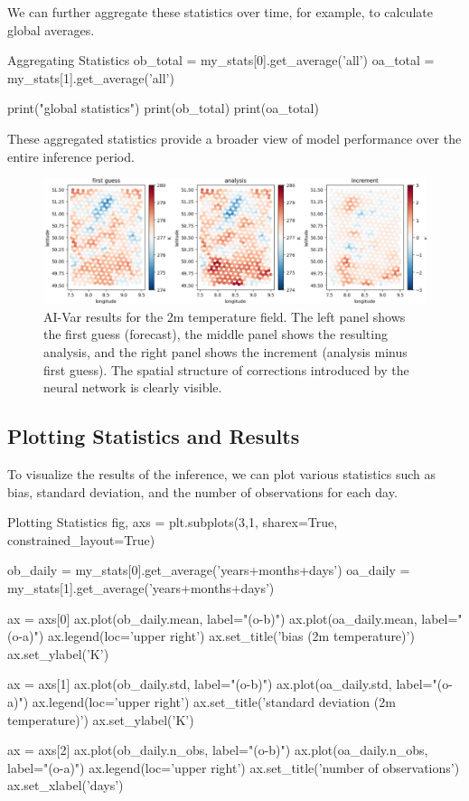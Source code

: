 We can further aggregate these statistics over time, for example, to calculate global averages.

\begin{codeonly}{Aggregating Statistics}
ob_total = my_stats[0].get_average('all')
oa_total = my_stats[1].get_average('all')

print("global statistics")
print(ob_total)
print(oa_total)
\end{codeonly}

These aggregated statistics provide a broader view of model performance over the entire inference period.


\begin{figure}[ht]
\centering
\includegraphics[width=\textwidth]{images/aivar4.png}
\caption{AI-Var results for the 2m temperature field. The left panel shows the first guess (forecast), the middle panel shows the resulting analysis, and the right panel shows the increment (analysis minus first guess). The spatial structure of corrections introduced by the neural network is clearly visible.}
\end{figure}
%
\subsection{Plotting Statistics and Results}

To visualize the results of the inference, we can plot various statistics such as bias, standard deviation, and the number of observations for each day.

\begin{codeonly}{Plotting Statistics}
fig, axs = plt.subplots(3,1, sharex=True, constrained_layout=True)

ob_daily = my_stats[0].get_average('years+months+days')
oa_daily = my_stats[1].get_average('years+months+days')

ax = axs[0]
ax.plot(ob_daily.mean, label="(o-b)")
ax.plot(oa_daily.mean, label="(o-a)")
ax.legend(loc='upper right')
ax.set_title('bias (2m temperature)')
ax.set_ylabel('K')

ax = axs[1]
ax.plot(ob_daily.std, label="(o-b)")
ax.plot(oa_daily.std, label="(o-a)")
ax.legend(loc='upper right')
ax.set_title('standard deviation (2m temperature)')
ax.set_ylabel('K')

ax = axs[2]
ax.plot(ob_daily.n_obs, label="(o-b)")
ax.plot(oa_daily.n_obs, label="(o-a)")
ax.legend(loc='upper right')
ax.set_title('number of observations')
ax.set_xlabel('days')
\end{codeonly}

